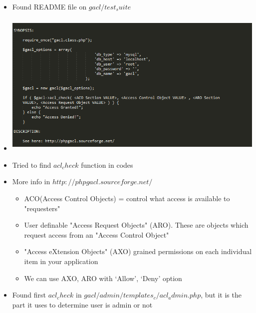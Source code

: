 \documentclass[paper=a4, fontsize=11pt]{scrartcl} %
\numberwithin{equation}{section} %
\numberwithin{figure}{section} %
\numberwithin{table}{section} %
\begin{document}
\begin{itemize}
		\item Found README file on $gacl/test_suite$
		\item 
		\includegraphics[width = 20cm, height=7cm]{pictures/sypnogacl.png}
		\item Tried to find $acl_check$ function in codes
		\item More info in $http://phpgacl.sourceforge.net/$
		
				\begin{itemize}
				\item ACO(Access Control Objects) =  control what access is available to "requesters"
				\item User definable "Access Request Objects" (ARO). These are objects which request access from an "Access Control Object"
				\item  "Access eXtension Objects" (AXO) grained permissions on each individual item in your application
				\item We can use AXO, ARO with ‘Allow’, ‘Deny’ option 
				\end{itemize}
		\item Found first $acl_check$ in $gacl/admin/templates_c/acl_admin.php$, but it is the part it uses to determine user is admin or not
		\begin{itemize}


\end{itemize}
\end{itemize}
\end{document}
